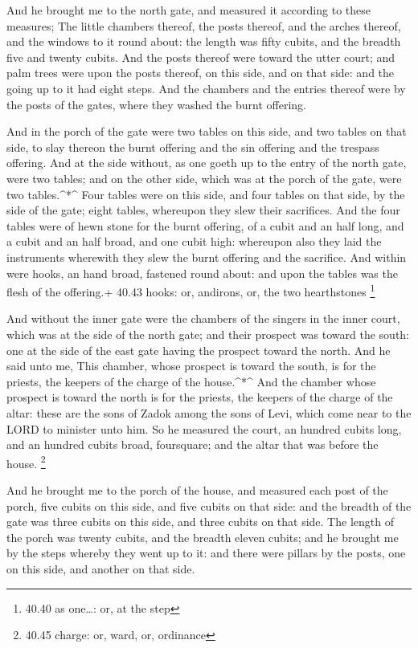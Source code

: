  And he brought me to the north gate, and measured it
according to these measures;  The little chambers thereof,
the posts thereof, and the arches thereof, and the windows to it round
about: the length was fifty cubits, and the breadth five and twenty
cubits.  And the posts thereof were toward the utter court;
and palm trees were upon the posts thereof, on this side, and on that
side: and the going up to it had eight steps.  And the
chambers and the entries thereof were by the posts of the gates, where
they washed the burnt offering.

 And in the porch of the gate were two tables on this side,
and two tables on that side, to slay thereon the burnt offering and the
sin offering and the trespass offering.  And at the side
without, as one goeth up to the entry of the north gate, were two
tables; and on the other side, which was at the porch of the gate, were
two tables.\^{}*\^{}  Four tables were on this side, and
four tables on that side, by the side of the gate; eight tables,
whereupon they slew their sacrifices.  And the four tables
were of hewn stone for the burnt offering, of a cubit and an half long,
and a cubit and an half broad, and one cubit high: whereupon also they
laid the instruments wherewith they slew the burnt offering and the
sacrifice.  And within were hooks, an hand broad, fastened
round about: and upon the tables was the flesh of the offering.+ 40.43
hooks: or, andirons, or, the two hearthstones \footnote{40.40 as
  one\ldots: or, at the step}

 And without the inner gate were the chambers of the
singers in the inner court, which was at the side of the north gate; and
their prospect was toward the south: one at the side of the east gate
having the prospect toward the north.  And he said unto me,
This chamber, whose prospect is toward the south, is for the priests,
the keepers of the charge of the house.\^{}*\^{}  And the
chamber whose prospect is toward the north is for the priests, the
keepers of the charge of the altar: these are the sons of Zadok among
the sons of Levi, which come near to the LORD to minister unto him.
 So he measured the court, an hundred cubits long, and an
hundred cubits broad, foursquare; and the altar that was before the
house. \footnote{40.45 charge: or, ward, or, ordinance}

 And he brought me to the porch of the house, and measured
each post of the porch, five cubits on this side, and five cubits on
that side: and the breadth of the gate was three cubits on this side,
and three cubits on that side.  The length of the porch was
twenty cubits, and the breadth eleven cubits; and he brought me by the
steps whereby they went up to it: and there were pillars by the posts,
one on this side, and another on that side.

